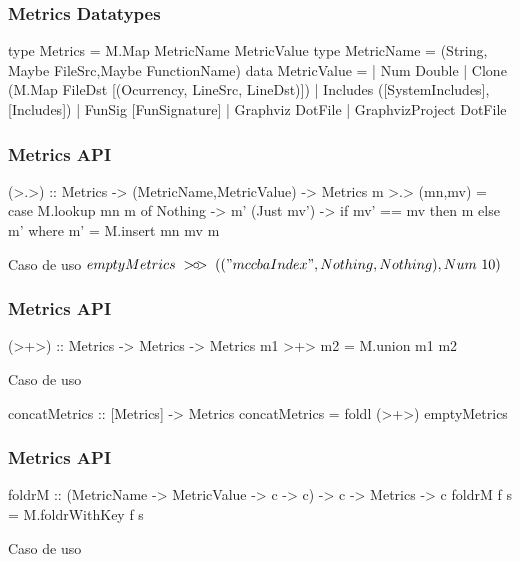 \documentclass{beamer}
\begin{document}
\begin{frame}[fragile] \frametitle{Metrics Datatypes}
\begin{haskellcode}
type Metrics = M.Map MetricName MetricValue
type MetricName = (String, Maybe FileSrc,Maybe FunctionName)
data MetricValue =
    | Num Double
    | Clone (M.Map FileDst [(Ocurrency, LineSrc, LineDst)])
    | Includes ([SystemIncludes],[Includes])
    | FunSig [FunSignature]
    | Graphviz DotFile
    | GraphvizProject DotFile																				 
\end{haskellcode}
\end{frame}

\newcommand{\metricsins}{\mathbin{>\mkern-7mu\circ\mkern-9mu>}}
\newcommand{\metricscat}{\mathbin{>\mkern-7mu+\mkern-11mu>}}
\begin{frame}[fragile] \frametitle{Metrics API}
\begin{haskellcode}
(>.>) :: Metrics -> (MetricName,MetricValue) -> Metrics
m >.> (mn,mv) = 
    case M.lookup mn m of
        Nothing    -> m'
        (Just mv') -> if mv' == mv then m else m'
    where m' = M.insert mn mv m
\end{haskellcode}
\begin{block}{Caso de uso}
$emptyMetrics~\metricsins~(("mccbaIndex",Nothing,Nothing), Num~10)$
\end{block}
\end{frame}

\begin{frame}[fragile] \frametitle{Metrics API}
\begin{haskellcode}
(>+>) :: Metrics -> Metrics -> Metrics
m1 >+> m2 = M.union m1 m2
\end{haskellcode}
\begin{block}{Caso de uso}
\begin{haskellcode}
concatMetrics :: [Metrics] -> Metrics
concatMetrics = foldl (>+>) emptyMetrics
\end{haskellcode}
\end{block}
\end{frame}

\begin{frame}[fragile] \frametitle{Metrics API}
\begin{haskellcode}
foldrM :: (MetricName -> MetricValue -> c -> c) -> c -> Metrics -> c
foldrM f s = M.foldrWithKey f s
\end{haskellcode}
\begin{block}{Caso de uso}
\end{block}
\end{frame}
\end{document}
